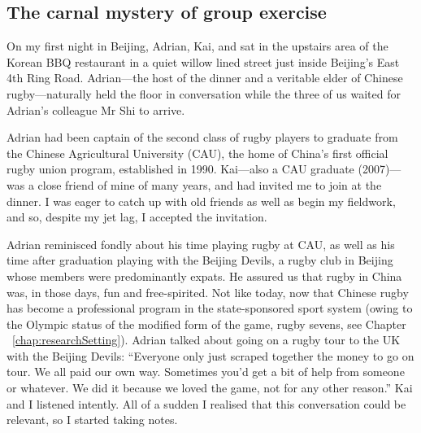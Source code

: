                                           \begin{CJK}{UTF8}{gbsn}

\section{The carnal mystery of group exercise \label{sect:adrian}}


On my first night in Beijing, Adrian, Kai, and sat in the upstairs area of the Korean BBQ restaurant in a quiet willow lined street just inside Beijing's East 4th Ring Road.  Adrian---the host of the dinner and a veritable elder of Chinese rugby---naturally held the floor in conversation while the three of us waited for Adrian's colleague Mr Shi to arrive.

Adrian had been captain of the second class of rugby players to graduate from the Chinese Agricultural University (CAU), the home of China's first official rugby union program, established in 1990. Kai---also a CAU graduate (2007)---was a close friend of mine of many years, and had invited me to join at the dinner.  I was eager to catch up with old friends as well as begin my fieldwork, and so, despite my jet lag, I accepted the invitation.

Adrian reminisced fondly about his time playing rugby at CAU, as well as his time after graduation playing with the Beijing Devils, a rugby club in Beijing whose members were predominantly expats.  He assured us that rugby in China was, in those days, fun and free-spirited.  Not like today, now that Chinese rugby has become a professional program in the state-sponsored sport system (owing to the Olympic status of the modified form of the game, rugby sevens, see Chapter ~\ref{chap:researchSetting}).  Adrian talked about going on a rugby tour to the UK with the Beijing Devils:  ``Everyone only just scraped together the money to go on tour.  We all paid our own way. Sometimes you'd get a bit of help from someone or whatever. We did it because we loved the game, not for any other reason.''   Kai and I listened intently.  All of a sudden I realised that this conversation could be relevant, so I started taking notes.


\end{CJK}
